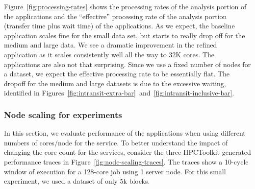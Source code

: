Figure~\ref{fig:processing-rates} shows the processing rates
of the analysis portion of the \intransit applications and the ``effective''
processing rate of the analysis portion (transfer time plus wait time) of the
\intransit applications.  As we expect, the baseline application scales fine for
the small data set, but starts to really drop off for the medium and large data.
We see a dramatic improvement in the \insitu refined application as it scales
consistently well all the way to 32K cores.  The \intransit applications are
also not that surprising.  Since we use a fixed number of nodes for a dataset,
we expect the effective processing rate to be essentially flat.  The dropoff for
the medium and large datasets is due to the excessive waiting, identified in
Figures~\ref{fig:intransit-extra-bar}~and~\ref{fig:intransit-inclusive-bar}.



\subsubsection{Node scaling for \intransit experiments}

In this section, we evaluate performance of the \intransit applications when
using different numbers of cores/node for the \intransit service.  To better
understand the impact of changing the core count for the services, consider the
three HPCToolkit-generated performance traces in
Figure~\ref{fig:node-scaling-traces}.  The traces show a 10-cycle window
of execution for a 128-core job using 1 server node. For this small experiment,
we used a dataset of only 5k blocks.

